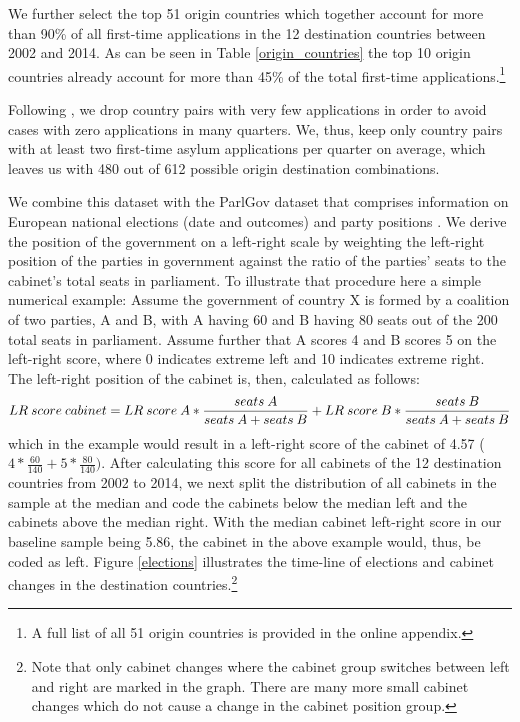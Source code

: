 \documentclass[a4paper,12pt]{article}
\begin{document}


We further select the top 51 origin countries which together account for more than 90\% of all first-time applications in the 12 destination countries between 2002 and 2014. As can be seen in Table \ref{origin_countries} the top 10 origin countries already account for more than 45\% of the total first-time applications.\footnote{A full list of all 51 origin countries is provided in the online appendix.}



Following \cite{hatton2016}, we drop country pairs with very few applications in order to avoid cases with zero applications in many quarters. We, thus, keep only country pairs with at least two first-time asylum applications per quarter on average, which leaves us with 480 out of 612 possible origin destination combinations.

We combine this dataset with the ParlGov dataset that comprises information on European national elections (date and outcomes) and party positions \citep{parlgov2016}. We derive the position of the government on a left-right scale by weighting the left-right position of the parties in government  against the ratio of the parties' seats to the cabinet's total seats in parliament. To illustrate that procedure here a simple numerical example: Assume the government of country X is formed by a coalition of two parties, A and B, with A having 60 and B having 80 seats out of the 200 total seats in parliament. Assume further that A scores 4 and B scores 5 on the left-right score, where 0 indicates extreme left and 10 indicates extreme right. The left-right position of the cabinet is, then, calculated as follows: 
\begin{equation*}
\tiny
LR~score~cabinet = LR~score~A * \frac{seats~A}{seats~A + seats~B} +LR~score~B * \frac{seats~B}{seats~A + seats~B} 
\end{equation*}which in the example would result in a left-right score of the cabinet of 4.57 ($4*\frac{60}{140} +5*\frac{80}{140})$.
After calculating this score for all cabinets of the 12 destination countries from 2002 to 2014, we next split the distribution of all cabinets in the sample at the median and code the cabinets below the median left and the cabinets above the median right. With the median cabinet left-right score in our baseline sample being 5.86, the cabinet in the above example would, thus, be coded as left. 
Figure \ref{elections} illustrates the time-line of elections and cabinet changes in the destination countries.\footnote{Note that only cabinet changes where the cabinet group switches between left and right are marked in the graph. There are many more small cabinet changes which do not cause a change in the cabinet position group.}
\end{document}
